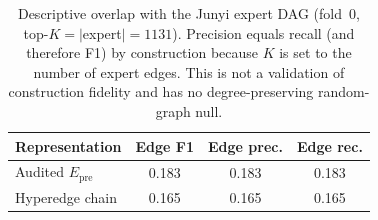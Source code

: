 \begin{table}[H]
\caption{Descriptive overlap with the Junyi expert DAG (fold~0, top-$K{=}|$expert$|{=}1131$). Precision equals recall (and therefore F1) by construction because $K$ is set to the number of expert edges. This is not a validation of construction fidelity and has no degree-preserving random-graph null.}
\label{tab:junyi-gt}
\centering
\begin{tabular}{@{}lccc@{}}
\toprule
Representation & Edge F1 & Edge prec. & Edge rec. \\
\midrule
Audited $E_{\mathrm{pre}}$ & 0.183 & 0.183 & 0.183 \\
Hyperedge chain & 0.165 & 0.165 & 0.165 \\
\bottomrule
\end{tabular}
\end{table}
